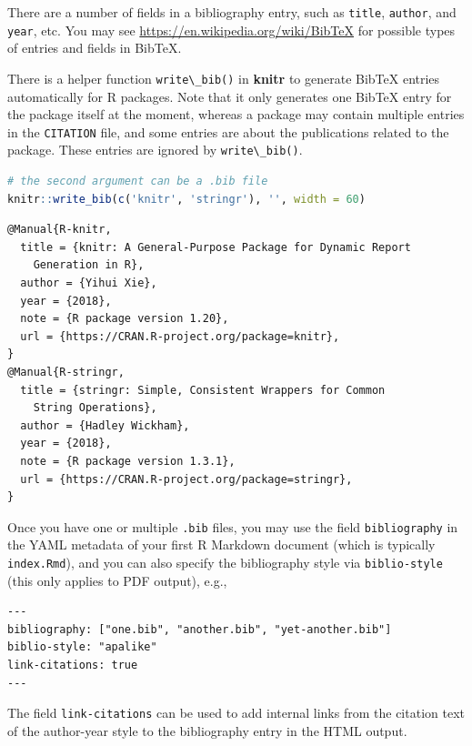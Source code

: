 \documentclass[doctor,openright,twoside]{sjtuthesis}
\newcommand{\passthrough}[1]{#1}
\theoremstyle{plain}
\theoremstyle{definition}
\theoremstyle{remark}
\theoremstyle{ocrenumbox}
\theoremstyle{plain}
\begin{document}
There are a number of fields in a bibliography entry, such as
\passthrough{\lstinline!title!}, \passthrough{\lstinline!author!}, and
\passthrough{\lstinline!year!}, etc. You may see
\url{https://en.wikipedia.org/wiki/BibTeX} for possible types of entries
and fields in BibTeX.

There is a helper function \passthrough{\lstinline!write\_bib()!} in
\textbf{knitr} to generate BibTeX entries automatically for R packages.
Note that it only generates one BibTeX entry for the package itself at
the moment, whereas a package may contain multiple entries in the
\passthrough{\lstinline!CITATION!} file, and some entries are about the
publications related to the package. These entries are ignored by
\passthrough{\lstinline!write\_bib()!}.

\begin{lstlisting}[language=R]
# the second argument can be a .bib file
knitr::write_bib(c('knitr', 'stringr'), '', width = 60)
\end{lstlisting}

\begin{lstlisting}
@Manual{R-knitr,
  title = {knitr: A General-Purpose Package for Dynamic Report
    Generation in R},
  author = {Yihui Xie},
  year = {2018},
  note = {R package version 1.20},
  url = {https://CRAN.R-project.org/package=knitr},
}
@Manual{R-stringr,
  title = {stringr: Simple, Consistent Wrappers for Common
    String Operations},
  author = {Hadley Wickham},
  year = {2018},
  note = {R package version 1.3.1},
  url = {https://CRAN.R-project.org/package=stringr},
}
\end{lstlisting}

Once you have one or multiple \passthrough{\lstinline!.bib!} files, you
may use the field \passthrough{\lstinline!bibliography!} in the YAML
metadata of your first R Markdown document (which is typically
\passthrough{\lstinline!index.Rmd!}), and you can also specify the
bibliography style via \passthrough{\lstinline!biblio-style!} (this only
applies to PDF output), e.g.,

\begin{lstlisting}
---
bibliography: ["one.bib", "another.bib", "yet-another.bib"]
biblio-style: "apalike"
link-citations: true
---
\end{lstlisting}

The field \passthrough{\lstinline!link-citations!} can be used to add
internal links from the citation text of the author-year style to the
bibliography entry in the HTML output.
\end{document}
